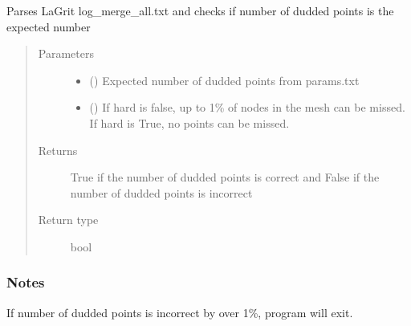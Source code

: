 \documentclass[letterpaper,10pt,english]{sphinxmanual}
\begin{document}
\begin{fulllineitems}
\label{\detokenize{pydfnworks:pydfnworks.dfnGen.mesh_dfn_helper.check_dudded_points}}
Parses LaGrit log\_merge\_all.txt and checks if number of dudded points is the expected number
\begin{quote}\begin{description}
\item[{Parameters}] \leavevmode\begin{itemize}
\item {} 
 () \textendash{} Expected number of dudded points from params.txt

\item {} 
 () \textendash{} If hard is false, up to 1\% of nodes in the mesh can be missed. If hard is True, no points can be missed.

\end{itemize}

\item[{Returns}] \leavevmode
{} \textendash{} True if the number of dudded points is correct and  False if the number of dudded points is incorrect

\item[{Return type}] \leavevmode
bool

\end{description}\end{quote}
\subsubsection*{Notes}

If number of dudded points is incorrect by over 1\%, program will exit.

\end{fulllineitems}

\end{document}
